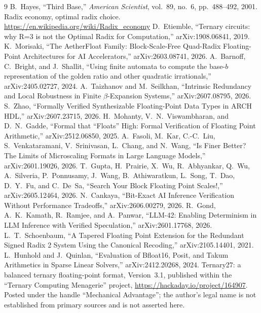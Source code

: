 \documentclass[11pt]{article}
\theoremstyle{definition}
\begin{document}
\begin{thebibliography}{9}
 B.~Hayes, ``Third Base,'' \emph{American Scientist}, vol.~89, no.~6, pp.~488--492, 2001.
 Radix economy, optimal radix choice. \url{https://en.wikipedia.org/wiki/Radix_economy}
 D.~Etiemble, ``Ternary circuits: why R=3 is not the
Optimal Radix for Computation,'' arXiv:1908.06841, 2019.
 K.~Morisaki, ``The AetherFloat Family: Block-Scale-Free
Quad-Radix Floating-Point Architectures for AI Accelerators,'' arXiv:2603.08741,
2026.
 A.~Barnoff, C.~Bright, and J.~Shallit, ``Using finite
automata to compute the base-$b$ representation of the golden ratio and other
quadratic irrationals,'' arXiv:2405.02727, 2024.
 A.~Taizhanov and M.~Seilkhan, ``Intrinsic Redundancy and
Local Robustness in Finite $\beta$-Expansion Systems,'' arXiv:2607.08795, 2026.
 S.~Zhao, ``Formally Verified Synthesizable Floating-Point
Data Types in ARCH HDL,'' arXiv:2607.23715, 2026.
 H.~Mohanty, V.~N.~Viswambharan, and D.~N.~Gadde, ``Formal
that ``Floats'' High: Formal Verification of Floating Point Arithmetic,''
arXiv:2512.06850, 2025.
 A.~Fasoli, M.~Kar, C.-C.~Liu, S.~Venkataramani,
V.~Srinivasan, L.~Chang, and N.~Wang, ``Is Finer Better? The Limits of
Microscaling Formats in Large Language Models,'' arXiv:2601.19026, 2026.
 T.~Gupta, H.~Prairie, X.~Wu, R.~Abhyankar,
Q.~Wu, A.~Silveria, P.~Ponnusamy, J.~Wang, B.~Athiwaratkun, L.~Song, T.~Dao,
D.~Y.~Fu, and C.~De~Sa, ``Search Your Block Floating Point Scales!,''
arXiv:2605.12464, 2026.
 N.~Cankaya, ``Bit-Exact AI Inference Verification Without
Performance Tradeoffs,'' arXiv:2606.00279, 2026.
 R.~Gond, A.~K.~Kamath, R.~Ramjee, and A.~Panwar,
``LLM-42: Enabling Determinism in LLM Inference with Verified Speculation,''
arXiv:2601.17768, 2026.
 L.~T.~Schoenbaum, ``A Tapered Floating Point Extension
for the Redundant Signed Radix 2 System Using the Canonical Recoding,''
arXiv:2105.14401, 2021.
 L.~Hunhold and J.~Quinlan, ``Evaluation of
Bfloat16, Posit, and Takum Arithmetics in Sparse Linear Solvers,''
arXiv:2412.20268, 2024.
 Ternary27: a balanced ternary floating-point format,
Version~3.1, published within the ``Ternary Computing Menagerie'' project,
\url{https://hackaday.io/project/164907}. Posted under the handle ``Mechanical
Advantage''; the author's legal name is not established from primary sources and
is not asserted here.

\end{thebibliography}
\end{document}
